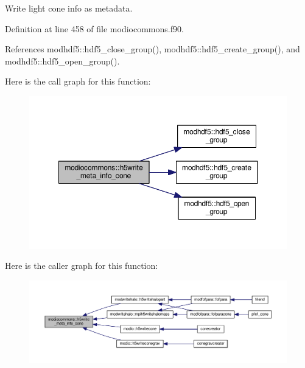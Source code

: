 Write light cone info as metadata. 



Definition at line 458 of file modiocommons.\-f90.



References modhdf5\-::hdf5\-\_\-close\-\_\-group(), modhdf5\-::hdf5\-\_\-create\-\_\-group(), and modhdf5\-::hdf5\-\_\-open\-\_\-group().



Here is the call graph for this function\-:\nopagebreak
\begin{figure}[H]
\begin{center}
\leavevmode
\includegraphics[width=350pt]{classmodiocommons_a7357bab67b152d137d4b2d43f30263e5_cgraph}
\end{center}
\end{figure}




Here is the caller graph for this function\-:\nopagebreak
\begin{figure}[H]
\begin{center}
\leavevmode
\includegraphics[width=350pt]{classmodiocommons_a7357bab67b152d137d4b2d43f30263e5_icgraph}
\end{center}
\end{figure}


